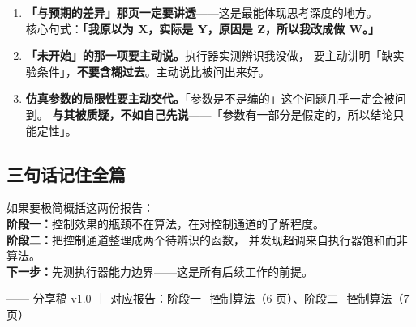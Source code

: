 \documentclass[11pt,a4paper]{ctexart}
\begin{document}
\begin{enumerate}
  \item \textbf{「与预期的差异」那页一定要讲透}——这是最能体现思考深度的地方。\\
        核心句式：\textbf{「我原以为 X，实际是 Y，原因是 Z，所以我改成做 W。」}

  \item \textbf{「未开始」的那一项要主动说。}执行器实测辨识我没做，
        要主动讲明「缺实验条件」，\textbf{不要含糊过去}。主动说比被问出来好。

  \item \textbf{仿真参数的局限性要主动交代。}「参数是不是编的」这个问题几乎一定会被问到。
        \textbf{与其被质疑，不如自己先说}——「参数有一部分是假定的，所以结论只能定性」。
\end{enumerate}

\subsection{三句话记住全篇}

\begin{yaodian}
如果要极简概括这两份报告：\\[4pt]
\textbf{阶段一：}控制效果的瓶颈不在算法，在对控制通道的了解程度。\\[2pt]
\textbf{阶段二：}把控制通道整理成两个待辨识的函数，
并发现超调来自执行器饱和而非算法。\\[2pt]
\textbf{下一步：}先测执行器能力边界——这是所有后续工作的前提。
\end{yaodian}

\vfill
\begin{center}\small\color{cGrey}
—— 分享稿 v1.0 ｜ 对应报告：阶段一\_控制算法（6 页）、阶段二\_控制算法（7 页）——
\end{center}
\end{document}
